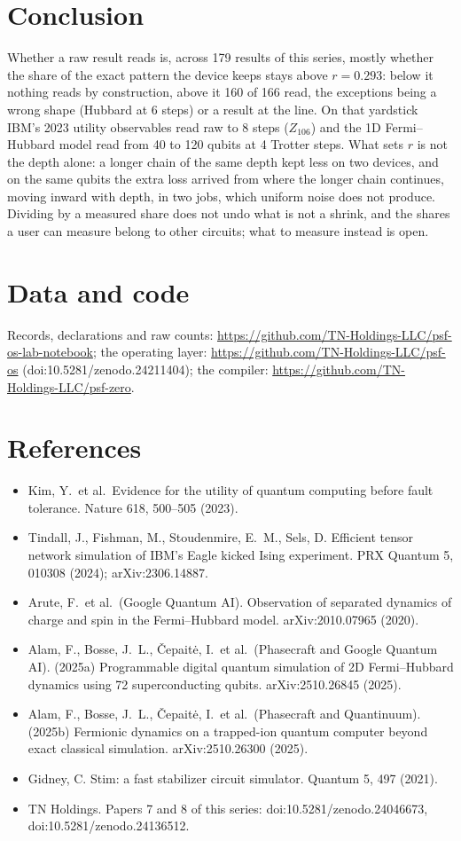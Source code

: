 \documentclass[10pt,a4paper]{article}
\begin{document}
\section{Conclusion}
Whether a raw result reads is, across 179 results of this series, mostly whether the share of the exact pattern the
device keeps stays above $r = 0.293$: below it nothing reads by construction, above it 160 of 166 read, the exceptions
being a wrong shape (Hubbard at 6 steps) or a result at the line. On that yardstick IBM's 2023 utility observables read
raw to 8 steps ($Z_{106}$) and the 1D Fermi--Hubbard model read from 40 to 120 qubits at 4 Trotter steps. What sets
$r$ is not the depth alone: a longer chain of the same depth kept less on two devices, and on the same qubits the extra
loss arrived from where the longer chain continues, moving inward with depth, in two jobs, which uniform noise does not
produce. Dividing by a measured share does not undo what is not a shrink, and the shares a user can measure belong to
other circuits; what to measure instead is open.

\section*{Data and code}
Records, declarations and raw counts: \url{https://github.com/TN-Holdings-LLC/psf-os-lab-notebook}; the operating
layer: \url{https://github.com/TN-Holdings-LLC/psf-os} (doi:10.5281/zenodo.24211404); the compiler:
\url{https://github.com/TN-Holdings-LLC/psf-zero}.

\section*{References}
\begin{itemize}
\item Kim, Y.\ et al.\ Evidence for the utility of quantum computing before fault tolerance. Nature 618, 500--505 (2023).
\item Tindall, J., Fishman, M., Stoudenmire, E.\ M., Sels, D. Efficient tensor network simulation of IBM's Eagle kicked
Ising experiment. PRX Quantum 5, 010308 (2024); arXiv:2306.14887.
\item Arute, F.\ et al.\ (Google Quantum AI). Observation of separated dynamics of charge and spin in the Fermi--Hubbard
model. arXiv:2010.07965 (2020).
\item Alam, F., Bosse, J.\ L., \v{C}epait\.{e}, I.\ et al.\ (Phasecraft and Google Quantum AI). (2025a) Programmable digital
quantum simulation of 2D Fermi--Hubbard dynamics using 72 superconducting qubits. arXiv:2510.26845 (2025).
\item Alam, F., Bosse, J.\ L., \v{C}epait\.{e}, I.\ et al.\ (Phasecraft and Quantinuum). (2025b) Fermionic dynamics on a
trapped-ion quantum computer beyond exact classical simulation. arXiv:2510.26300 (2025).
\item Gidney, C. Stim: a fast stabilizer circuit simulator. Quantum 5, 497 (2021).
\item TN Holdings. Papers 7 and 8 of this series: doi:10.5281/zenodo.24046673, doi:10.5281/zenodo.24136512.
\end{itemize}
\end{document}
